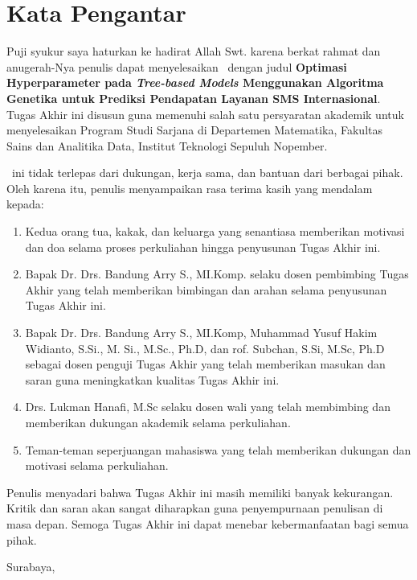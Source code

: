 \chapter*{Kata Pengantar}
Puji syukur saya haturkan ke hadirat Allah Swt. karena berkat rahmat dan anugerah-Nya penulis dapat menyelesaikan \ta \ dengan judul \textbf{Optimasi Hyperparameter pada \textit{Tree-based Models} Menggunakan  Algoritma Genetika untuk Prediksi Pendapatan Layanan SMS Internasional}. 
Tugas Akhir ini disusun guna memenuhi salah satu persyaratan akademik untuk menyelesaikan Program Studi Sarjana di Departemen Matematika, Fakultas Sains dan Analitika Data, Institut Teknologi Sepuluh Nopember.

\TA~ini tidak terlepas dari dukungan, kerja sama, dan bantuan dari berbagai pihak. 
Oleh karena itu, penulis menyampaikan rasa terima kasih yang mendalam kepada: 

\begin{enumerate}
    \item Kedua orang tua, kakak, dan keluarga yang senantiasa memberikan motivasi dan doa selama proses perkuliahan hingga penyusunan Tugas Akhir ini. 
    \item Bapak Dr. Drs. Bandung Arry S., MI.Komp. selaku dosen pembimbing Tugas Akhir yang telah memberikan bimbingan dan arahan selama penyusunan Tugas Akhir ini. 
    \item Bapak Dr. Drs. Bandung Arry S., MI.Komp, Muhammad Yusuf Hakim Widianto, S.Si., M. Si., M.Sc., Ph.D, dan rof. Subchan, S.Si, M.Sc, Ph.D sebagai dosen penguji Tugas Akhir yang telah memberikan masukan dan saran guna meningkatkan kualitas Tugas Akhir ini. 
    \item Drs. Lukman Hanafi, M.Sc selaku dosen wali yang telah membimbing dan memberikan dukungan akademik selama perkuliahan. 
    \item Teman-teman seperjuangan mahasiswa yang telah memberikan dukungan dan motivasi selama perkuliahan. 
\end{enumerate}

Penulis menyadari bahwa Tugas Akhir ini masih memiliki banyak kekurangan. 
Kritik dan saran akan sangat diharapkan guna penyempurnaan penulisan di masa depan.
Semoga Tugas Akhir ini dapat menebar kebermanfaatan bagi semua pihak. 


\makeatletter
\begin{flushright}
    Surabaya, \@tanggal \@bulan \@tahun

    \vspace{2cm}
    \@nama
\end{flushright}
\makeatother